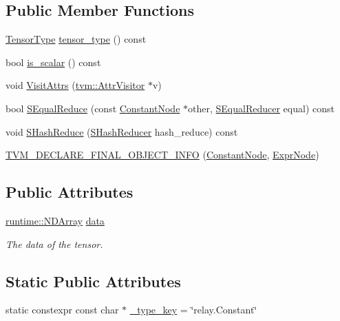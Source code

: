 \subsection*{Public Member Functions}
\begin{DoxyCompactItemize}
\item 
\hyperlink{namespacetvm_1_1relay_a52c13723bba53f4953dfd10c34d480f8}{Tensor\+Type} \hyperlink{classtvm_1_1relay_1_1ConstantNode_a1c97c4862cbd6810fa9c47bf607a3645}{tensor\+\_\+type} () const 
\item 
bool \hyperlink{classtvm_1_1relay_1_1ConstantNode_a68d932e73863700422945c20c851a120}{is\+\_\+scalar} () const 
\item 
void \hyperlink{classtvm_1_1relay_1_1ConstantNode_a1429ea0c386bb79759e8d12fb7eaabf2}{Visit\+Attrs} (\hyperlink{classtvm_1_1AttrVisitor}{tvm\+::\+Attr\+Visitor} $\ast$v)
\item 
bool \hyperlink{classtvm_1_1relay_1_1ConstantNode_a11eec9df72c80971a12b987a2576d1f4}{S\+Equal\+Reduce} (const \hyperlink{classtvm_1_1relay_1_1ConstantNode}{Constant\+Node} $\ast$other, \hyperlink{classtvm_1_1SEqualReducer}{S\+Equal\+Reducer} equal) const 
\item 
void \hyperlink{classtvm_1_1relay_1_1ConstantNode_a7fdbe7b97858236356901fbccb08c709}{S\+Hash\+Reduce} (\hyperlink{classtvm_1_1SHashReducer}{S\+Hash\+Reducer} hash\+\_\+reduce) const 
\item 
\hyperlink{classtvm_1_1relay_1_1ConstantNode_ad321216b91f256cbd425b5ca251e3ed4}{T\+V\+M\+\_\+\+D\+E\+C\+L\+A\+R\+E\+\_\+\+F\+I\+N\+A\+L\+\_\+\+O\+B\+J\+E\+C\+T\+\_\+\+I\+N\+FO} (\hyperlink{classtvm_1_1relay_1_1ConstantNode}{Constant\+Node}, \hyperlink{namespacetvm_1_1relay_a387f18e050d016c52ea6c4781e7cff6c}{Expr\+Node})
\end{DoxyCompactItemize}
\subsection*{Public Attributes}
\begin{DoxyCompactItemize}
\item 
\hyperlink{classtvm_1_1runtime_1_1NDArray}{runtime\+::\+N\+D\+Array} \hyperlink{classtvm_1_1relay_1_1ConstantNode_ae13d0996e9324caf76cc1fa8d7aa00f9}{data}
\begin{DoxyCompactList}\small\item\em The data of the tensor. \end{DoxyCompactList}\end{DoxyCompactItemize}
\subsection*{Static Public Attributes}
\begin{DoxyCompactItemize}
\item 
static constexpr const char $\ast$ \hyperlink{classtvm_1_1relay_1_1ConstantNode_a5ce2e38f5bc9344b048f30e2a9dda7c5}{\+\_\+type\+\_\+key} = \char`\"{}relay.\+Constant\char`\"{}
\end{DoxyCompactItemize}


